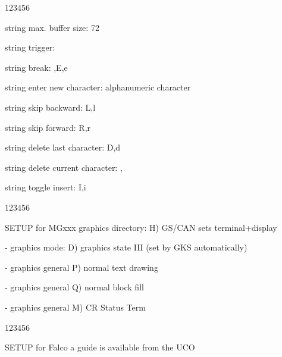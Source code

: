 \begin{DLtt}{123456}
\item[string max. buffer size:]72
\item[string trigger:]
\item[string break:],E,e
\item[string enter new character:]alphanumeric character
\item[string skip backward:]L,l
\item[string skip forward:]R,r
\item[string delete last character:]D,d
\item[string delete current character:], 
\item[string toggle insert:]I,i
\end{DLtt}
\begin{DLtt}{123456}
\item[SETUP for MGxxx]graphics directory: H) GS/CAN sets terminal+display
\item[-]graphics mode: D) graphics state III (set by GKS automatically)
\item[-]graphics general P) normal text drawing
\item[-]graphics general Q) normal block fill
\item[-]graphics general M) CR Status Term
\end{DLtt}
\begin{DLtt}{123456}
\item[SETUP for Falco]a guide is available from the UCO
\end{DLtt}
